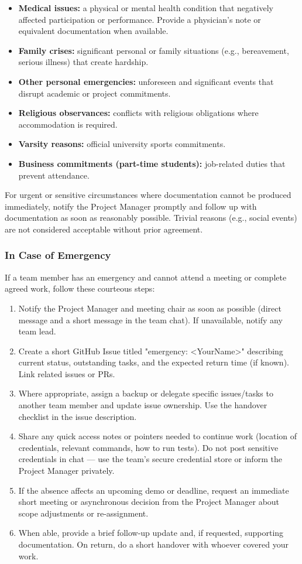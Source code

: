 \documentclass{article}
\begin{document}
\begin{itemize}
  \item \textbf{Medical issues:} a physical or mental health condition that negatively affected participation or performance. Provide a physician's note or equivalent documentation when available.
  \item \textbf{Family crises:} significant personal or family situations (e.g., bereavement, serious illness) that create hardship.
  \item \textbf{Other personal emergencies:} unforeseen and significant events that disrupt academic or project commitments.
  \item \textbf{Religious observances:} conflicts with religious obligations where accommodation is required.
  \item \textbf{Varsity reasons:} official university sports commitments.
  \item \textbf{Business commitments (part-time students):} job-related duties that prevent attendance.
\end{itemize}

For urgent or sensitive circumstances where documentation cannot be produced immediately, notify the Project Manager promptly and follow up with documentation as soon as reasonably possible. Trivial reasons (e.g., social events) are not considered acceptable without prior agreement.

\subsubsection*{In Case of Emergency}

If a team member has an emergency and cannot attend a meeting or complete agreed work, follow these courteous steps:
\begin{enumerate}
  \item Notify the Project Manager and meeting chair as soon as possible (direct message and a short message in the team chat). If unavailable, notify any team lead.
  \item Create a short GitHub Issue titled "emergency: <YourName>" describing current status, outstanding tasks, and the expected return time (if known). Link related issues or PRs.
  \item Where appropriate, assign a backup or delegate specific issues/tasks to another team member and update issue ownership. Use the handover checklist in the issue description.
  \item Share any quick access notes or pointers needed to continue work (location of credentials, relevant commands, how to run tests). Do not post sensitive credentials in chat — use the team's secure credential store or inform the Project Manager privately.
  \item If the absence affects an upcoming demo or deadline, request an immediate short meeting or asynchronous decision from the Project Manager about scope adjustments or re-assignment.
  \item When able, provide a brief follow-up update and, if requested, supporting documentation. On return, do a short handover with whoever covered your work.
\end{enumerate}
\end{document}
